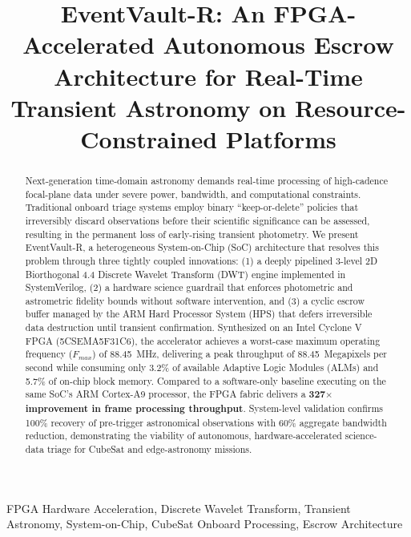 \documentclass[conference]{IEEEtran}
\begin{document}
\title{EventVault-R: An FPGA-Accelerated Autonomous Escrow Architecture for Real-Time Transient Astronomy on Resource-Constrained Platforms}

\author{
}

\maketitle

\begin{abstract}
Next-generation time-domain astronomy demands real-time processing of high-cadence focal-plane data under severe power, bandwidth, and computational constraints. Traditional onboard triage systems employ binary ``keep-or-delete'' policies that irreversibly discard observations before their scientific significance can be assessed, resulting in the permanent loss of early-rising transient photometry. We present EventVault-R, a heterogeneous System-on-Chip (SoC) architecture that resolves this problem through three tightly coupled innovations: (1) a deeply pipelined 3-level 2D Biorthogonal 4.4 Discrete Wavelet Transform (DWT) engine implemented in SystemVerilog, (2) a hardware science guardrail that enforces photometric and astrometric fidelity bounds without software intervention, and (3) a cyclic escrow buffer managed by the ARM Hard Processor System (HPS) that defers irreversible data destruction until transient confirmation. Synthesized on an Intel Cyclone V FPGA (5CSEMA5F31C6), the accelerator achieves a worst-case maximum operating frequency ($F_{max}$) of 88.45~MHz, delivering a peak throughput of 88.45~Megapixels per second while consuming only 3.2\% of available Adaptive Logic Modules (ALMs) and 5.7\% of on-chip block memory. Compared to a software-only baseline executing on the same SoC's ARM Cortex-A9 processor, the FPGA fabric delivers a \textbf{327$\times$ improvement in frame processing throughput}. System-level validation confirms 100\% recovery of pre-trigger astronomical observations with 60\% aggregate bandwidth reduction, demonstrating the viability of autonomous, hardware-accelerated science-data triage for CubeSat and edge-astronomy missions.
\end{abstract}

\begin{IEEEkeywords}
FPGA Hardware Acceleration, Discrete Wavelet Transform, Transient Astronomy, System-on-Chip, CubeSat Onboard Processing, Escrow Architecture
\end{IEEEkeywords}
\end{document}

